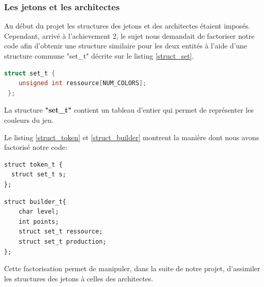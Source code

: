 \documentclass{article}
\begin{document}

        \subsubsection{Les jetons et les architectes} 
        \hspace{1em} Au début du projet les structures des jetons et des architectes étaient imposés. Cependant, arrivé à l'achievement 2, le sujet nous demandait de factoriser notre code afin d'obtenir une structure similaire pour les deux entités à l'aide d'une structure commune "set\_t" décrite sur le listing \ref{struct_set}.

\begin{lstlisting}[language=c, frame=single, caption={Implementation de la structure set\_t},label=struct_set]
struct set_t {
    unsigned int ressource[NUM_COLORS];
 };

\end{lstlisting}
            
        \vspace{0.5cm}
        La structure \textbf{"set\_t"} contient un tableau d'entier qui permet de représenter les couleurs du jeu.

        Le listing \ref{struct_token} et \ref{struct_builder} montrent la manière dont nous avons factorisé notre code:
        \vspace{0.5cm}

\begin{lstlisting}[frame=single, caption={Code des structures des jetons },label=struct_token]
struct token_t {
  struct set_t s;
};
\end{lstlisting}

    \vspace{0.5cm}

\begin{lstlisting}[frame=single, caption={Code des structures des architectes},label=struct_builder]
struct builder_t{
    char level;
    int points;
    struct set_t ressource;
    struct set_t production;
};
\end{lstlisting}
\vspace{0.5cm}
        Cette factorisation permet de manipuler, dans la suite de notre projet, d'assimiler les structures des jetons à celles des architectes. 
\end{document}
